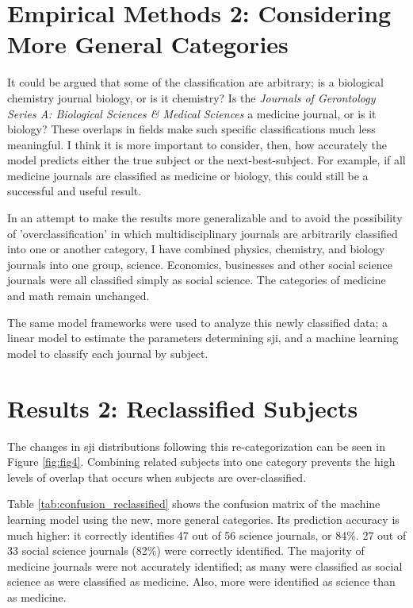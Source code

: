 \documentclass[12pt,english]{article}
\begin{document}
\section{Empirical Methods 2: Considering More General Categories}

It could be argued that some of the classification are arbitrary; is a biological chemistry journal biology, or is it chemistry? Is the \textit{Journals of Gerontology Series A: Biological Sciences \& Medical Sciences} a medicine journal, or is it biology? These overlaps in fields make such specific classifications much less meaningful. I think it is more important to consider, then, how accurately the model predicts either the true subject or the next-best-subject. For example, if all medicine journals are classified as medicine or biology, this could still be a successful and useful result.

In an attempt to make the results more generalizable and to avoid the possibility of 'overclassification' in which multidisciplinary journals are arbitrarily classified into one or another category, I have combined physics, chemistry, and biology journals into one group, science. Economics, businesses and other social science journals were all classified simply as social science. The categories of medicine and math remain unchanged.

The same model frameworks were used to analyze this newly classified data; a linear model to estimate the parameters determining sji, and a machine learning model to classify each journal by subject.

\section{Results 2: Reclassified Subjects}

The changes in sji distributions following this re-categorization can be seen in Figure \ref{fig:fig4}. Combining related subjects into one category prevents the high levels of overlap that occurs when subjects are over-classified. 

Table \ref{tab:confusion_reclassified} shows the confusion matrix of the machine learning model using the new, more general categories. Its prediction accuracy is much higher: it correctly identifies 47 out of 56 science journals, or 84\%. 27 out of 33 social science journals (82\%) were correctly identified. The majority of medicine journals were not accurately identified; as many were classified as social science as were classified as medicine. Also, more were identified as science than as medicine.
\end{document}

